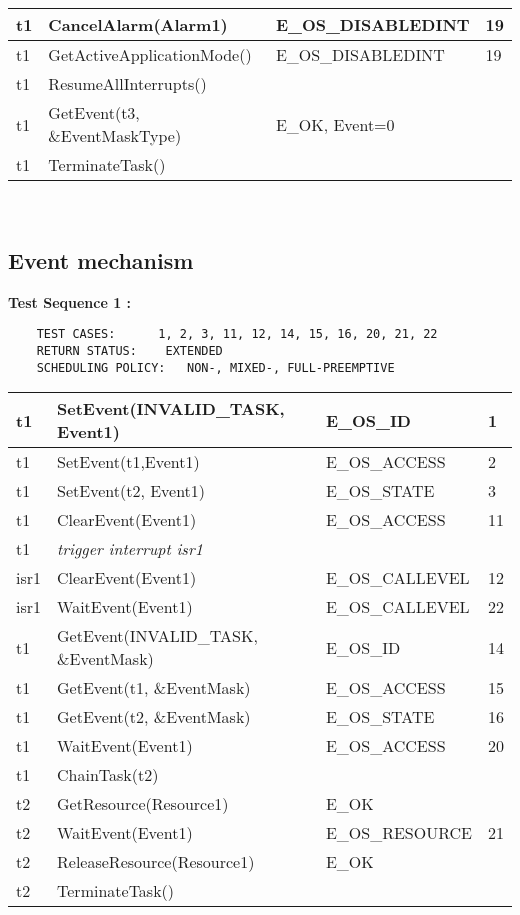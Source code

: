 \documentclass[10pt]{article}
\newlength{\Li}\settowidth{\Li}{Running}
\newlength{\Lii}\setlength{\Lii}{7cm}
\newlength{\Liiii}\setlength{\Liiii}{0.9cm}
\newlength{\Liii}\setlength{\Liii}{\textwidth} \addtolength{\Liii}{-\Li} \addtolength{\Liii}{-\Lii} \addtolength{\Liii}{-\Liiii}
\begin{document}
\begin{supertabular}{|p{\Li}|p{\Lii}|p{\Liii}|p{\Liiii}|}
	t1	& CancelAlarm(Alarm1)							& E\_OS\_DISABLEDINT	& 19 \\ \hline
	t1	& GetActiveApplicationMode()						& E\_OS\_DISABLEDINT	& 19 \\ \hline
	t1	& ResumeAllInterrupts()							& 	 				& \\ \hline
	t1	& GetEvent(t3, \&EventMaskType)					& E\_OK, Event=0		& \\ \hline
	t1	& TerminateTask()								& 	 				& \\ \hline
	\end{supertabular} \\
	
\subsection{Event mechanism}

	\textbf{Test Sequence 1 :}
	\begin{lstlisting}
	TEST CASES:		 1, 2, 3, 11, 12, 14, 15, 16, 20, 21, 22
	RETURN STATUS:	  EXTENDED 
	SCHEDULING POLICY:   NON-, MIXED-, FULL-PREEMPTIVE
	\end{lstlisting}
	

	\begin{supertabular}{|p{\Li}|p{\Lii}|p{\Liii}|p{\Liiii}|} \hline 
	t1	& SetEvent(INVALID\_TASK, Event1)		& E\_OS\_ID			& 1 \\ \hline
	t1 	& SetEvent(t1,Event1) 				& E\_OS\_ACCESS		& 2 \\ \hline
	t1 	& SetEvent(t2, Event1) 				& E\_OS\_STATE 		& 3 \\ \hline
	t1 	& ClearEvent(Event1) 					& E\_OS\_ACCESS 		& 11 \\ \hline 
	t1	& \textit{trigger interrupt isr1}				& 					&   \\ \hline 
	isr1 	& ClearEvent(Event1) 					& E\_OS\_CALLEVEL	& 12  \\ \hline 
	isr1 	& WaitEvent(Event1) 					& E\_OS\_CALLEVEL 	& 22  \\ \hline 
	t1	& GetEvent(INVALID\_TASK, \&EventMask) 	& E\_OS\_ID			& 14  \\ \hline 
	t1 	& GetEvent(t1, \&EventMask)			& E\_OS\_ACCESS 		& 15  \\ \hline 
	t1	& GetEvent(t2, \&EventMask) 			& E\_OS\_STATE 		& 16  \\ \hline 
	t1	& WaitEvent(Event1) 					& E\_OS\_ACCESS 		& 20  \\ \hline 
	t1	& ChainTask(t2)						&					&   \\ \hline 
	t2 	& GetResource(Resource1) 				& E\_OK				&  \\ \hline 
	t2	& WaitEvent(Event1) 					& E\_OS\_RESOURCE 	& 21  \\ \hline 
	t2	& ReleaseResource(Resource1) 			& E\_OK				&  \\ \hline 
	t2	& TerminateTask()						&					&  \\ \hline 
	\end{supertabular} \\
\end{document}
